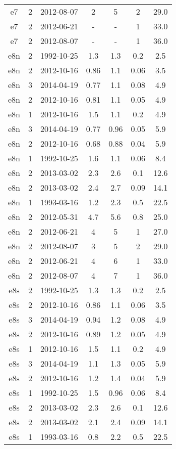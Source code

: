 \begin{table*}[htp]
\begin{tabular}{ccccccc}
e7 & 2 & 2012-08-07 & 2 & 5 & 2 & 29.0 \\
e7 & 2 & 2012-06-21 & - & - & 1 & 33.0 \\
e7 & 2 & 2012-08-07 & - & - & 1 & 36.0 \\
e8n & 2 & 1992-10-25 & 1.3 & 1.3 & 0.2 & 2.5 \\
e8n & 2 & 2012-10-16 & 0.86 & 1.1 & 0.06 & 3.5 \\
e8n & 3 & 2014-04-19 & 0.77 & 1.1 & 0.08 & 4.9 \\
e8n & 2 & 2012-10-16 & 0.81 & 1.1 & 0.05 & 4.9 \\
e8n & 1 & 2012-10-16 & 1.5 & 1.1 & 0.2 & 4.9 \\
e8n & 3 & 2014-04-19 & 0.77 & 0.96 & 0.05 & 5.9 \\
e8n & 2 & 2012-10-16 & 0.68 & 0.88 & 0.04 & 5.9 \\
e8n & 1 & 1992-10-25 & 1.6 & 1.1 & 0.06 & 8.4 \\
e8n & 2 & 2013-03-02 & 2.3 & 2.6 & 0.1 & 12.6 \\
e8n & 2 & 2013-03-02 & 2.4 & 2.7 & 0.09 & 14.1 \\
e8n & 1 & 1993-03-16 & 1.2 & 2.3 & 0.5 & 22.5 \\
e8n & 2 & 2012-05-31 & 4.7 & 5.6 & 0.8 & 25.0 \\
e8n & 2 & 2012-06-21 & 4 & 5 & 1 & 27.0 \\
e8n & 2 & 2012-08-07 & 3 & 5 & 2 & 29.0 \\
e8n & 2 & 2012-06-21 & 4 & 6 & 1 & 33.0 \\
e8n & 2 & 2012-08-07 & 4 & 7 & 1 & 36.0 \\
e8s & 2 & 1992-10-25 & 1.3 & 1.3 & 0.2 & 2.5 \\
e8s & 2 & 2012-10-16 & 0.86 & 1.1 & 0.06 & 3.5 \\
e8s & 3 & 2014-04-19 & 0.94 & 1.2 & 0.08 & 4.9 \\
e8s & 2 & 2012-10-16 & 0.89 & 1.2 & 0.05 & 4.9 \\
e8s & 1 & 2012-10-16 & 1.5 & 1.1 & 0.2 & 4.9 \\
e8s & 3 & 2014-04-19 & 1.1 & 1.3 & 0.05 & 5.9 \\
e8s & 2 & 2012-10-16 & 1.2 & 1.4 & 0.04 & 5.9 \\
e8s & 1 & 1992-10-25 & 1.5 & 0.96 & 0.06 & 8.4 \\
e8s & 2 & 2013-03-02 & 2.3 & 2.6 & 0.1 & 12.6 \\
e8s & 2 & 2013-03-02 & 2.1 & 2.4 & 0.09 & 14.1 \\
e8s & 1 & 1993-03-16 & 0.8 & 2.2 & 0.5 & 22.5 \\

\end{tabular}
\end{table*}
